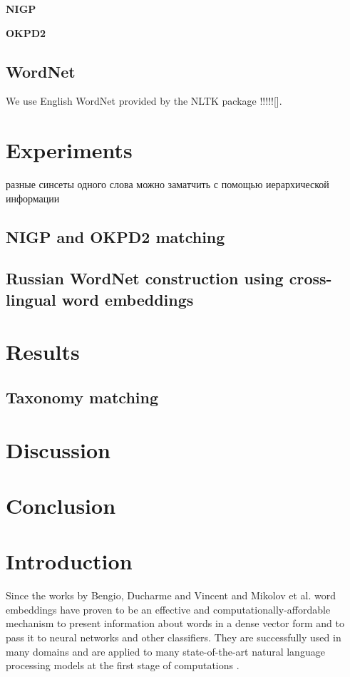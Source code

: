 \documentclass[11pt,a4paper]{article}
\begin{document}
\textbf{NIGP}

\textbf{OKPD2}
\subsection{WordNet}
We use English WordNet provided by the NLTK package !!!!![].
\section{Experiments}
\foreignlanguage{russian}{разные синсеты одного слова можно заматчить с помощью иерархической информации}
\subsection{NIGP and OKPD2 matching}
\subsection{Russian WordNet construction using cross-lingual word embeddings}
\section{Results}
\subsection{Taxonomy matching}
\section{Discussion}
\section{Conclusion}


\section{Introduction}
Since the works by Bengio, Ducharme and Vincent \cite{bengio} and Mikolov et al. \cite{mikolov-representations-2013} word embeddings have proven to be an effective and computationally-affordable mechanism to present information about words in a dense vector form and to pass it to neural networks and other classifiers. They are successfully used in many domains and are applied to many state-of-the-art natural language processing models at the first stage of computations \cite{levy-goldberg-2015}.
\end{document}
